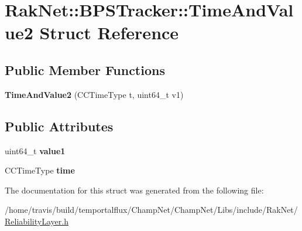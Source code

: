\hypertarget{struct_rak_net_1_1_b_p_s_tracker_1_1_time_and_value2}{\section{Rak\-Net\-:\-:B\-P\-S\-Tracker\-:\-:Time\-And\-Value2 Struct Reference}
\label{struct_rak_net_1_1_b_p_s_tracker_1_1_time_and_value2}
}
\subsection*{Public Member Functions}
\begin{DoxyCompactItemize}
\item 
\hypertarget{struct_rak_net_1_1_b_p_s_tracker_1_1_time_and_value2_a786f10ae452f1514726bb49d80cafc61}{{\bfseries Time\-And\-Value2} (C\-C\-Time\-Type t, uint64\-\_\-t v1)}\label{struct_rak_net_1_1_b_p_s_tracker_1_1_time_and_value2_a786f10ae452f1514726bb49d80cafc61}

\end{DoxyCompactItemize}
\subsection*{Public Attributes}
\begin{DoxyCompactItemize}
\item 
\hypertarget{struct_rak_net_1_1_b_p_s_tracker_1_1_time_and_value2_af744d29429551c1392630ca201aebe98}{uint64\-\_\-t {\bfseries value1}}\label{struct_rak_net_1_1_b_p_s_tracker_1_1_time_and_value2_af744d29429551c1392630ca201aebe98}

\item 
\hypertarget{struct_rak_net_1_1_b_p_s_tracker_1_1_time_and_value2_a6d9a156eb2e243bec68ef53ff9eeb6e6}{C\-C\-Time\-Type {\bfseries time}}\label{struct_rak_net_1_1_b_p_s_tracker_1_1_time_and_value2_a6d9a156eb2e243bec68ef53ff9eeb6e6}

\end{DoxyCompactItemize}


The documentation for this struct was generated from the following file\-:\begin{DoxyCompactItemize}
\item 
/home/travis/build/temportalflux/\-Champ\-Net/\-Champ\-Net/\-Libs/include/\-Rak\-Net/\hyperlink{_reliability_layer_8h}{Reliability\-Layer.\-h}\end{DoxyCompactItemize}
